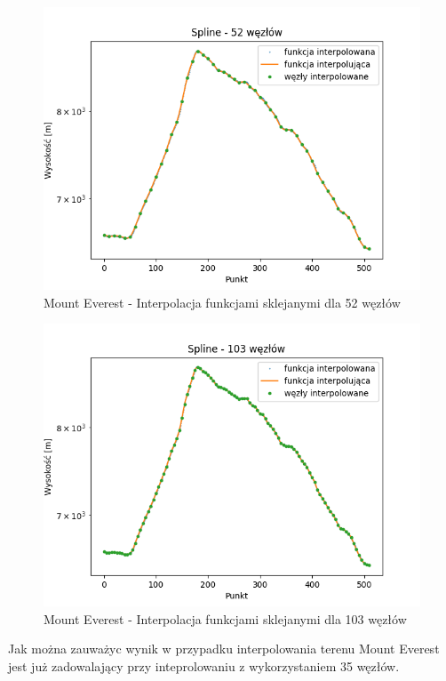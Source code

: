 \documentclass[12pt]{extarticle}
\begin{document}
\begin{figure}[H]
    \centering
    \includegraphics[scale=0.8]{interpolation_MountEverest_Spline_52.png}
    \caption{Mount Everest - Interpolacja funkcjami sklejanymi dla 52 węzłów}
\end{figure}
\begin{figure}[H]
    \centering
    \includegraphics[scale=0.8]{interpolation_MountEverest_Spline_103.png}
    \caption{Mount Everest - Interpolacja funkcjami sklejanymi dla 103 węzłów}
\end{figure}
Jak można zauważyc wynik w przypadku interpolowania terenu Mount Everest jest już zadowalający przy inteprolowaniu z wykorzystaniem 35 węzłów.
\end{document}
